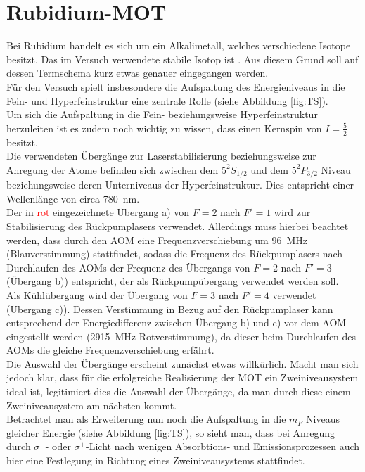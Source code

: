 \documentclass[
class=book,
accentcolor=1b,
custommargins=geometry,
fontsize=11pt,
thesis={type=Versuchsanleitung},
ruledheaders=all,
headline=false,
instbox=false,
marginpar=false,
title=small,
ignore-missing-data=true,
twoside=false,
logofile=apqdesign/tuda_logo.pdf,
pdfa=false %
]{apqpub}
\begin{document}
					\section{Rubidium-MOT}					
					Bei Rubidium handelt es sich um ein Alkalimetall, welches verschiedene Isotope besitzt. 
					Das im Versuch verwendete stabile Isotop ist . Aus diesem Grund soll auf dessen Termschema kurz etwas genauer eingegangen werden.\\
					Für den Versuch spielt insbesondere die Aufspaltung des Energieniveaus in die Fein- und Hyperfeinstruktur eine zentrale Rolle (siehe Abbildung \ref{fig:TS}).\\
					Um sich die Aufspaltung in die Fein- beziehungsweise Hyperfeinstruktur herzuleiten ist es zudem noch wichtig zu wissen, dass  einen Kernspin von $I=\frac{5}{2}$ besitzt.\\ 
					Die verwendeten Übergänge zur Laserstabilisierung beziehungsweise zur Anregung der Atome befinden sich zwischen dem $5^2S_{1/2}$ und dem $5^2P_{3/2}$ Niveau beziehungsweise deren Unterniveaus der Hyperfeinstruktur. 
					Dies entspricht einer Wellenlänge von circa \qty{780}{\nano\metre}.\\
					Der in \textcolor{red}{rot} eingezeichnete Übergang a) von $F=2$ nach $F'=1$ wird zur Stabilisierung des Rückpumplasers verwendet. 
					Allerdings muss hierbei beachtet werden, dass durch den AOM eine Frequenzverschiebung um \qty{96}{\mega\hertz} (Blauverstimmung) stattfindet, sodass die Frequenz des Rückpumplasers nach Durchlaufen des AOMs der Frequenz des Übergangs von $F=2$ nach $F'=3$ (Übergang b)) entspricht, der als Rückpumpübergang verwendet werden soll.\\
					Als Kühlübergang wird der Übergang von $F=3$ nach $F'=4$ verwendet (Übergang c)). 
					Dessen Verstimmung in Bezug auf den Rückpumplaser kann entsprechend der Energiedifferenz zwischen Übergang b) und c) vor dem AOM eingestellt werden (\qty{2915}{\mega\Hz} Rotverstimmung), da dieser beim Durchlaufen des AOMs die gleiche Frequenzverschiebung erfährt.\\   
					Die Auswahl der Übergänge erscheint zunächst etwas willkürlich. Macht man sich jedoch klar, dass für die erfolgreiche Realisierung der MOT ein Zweiniveausystem ideal ist, legitimiert dies die Auswahl der Übergänge, da man durch diese einem Zweiniveausystem am nächsten kommt.\\
					Betrachtet man als Erweiterung nun noch die Aufspaltung in die $m_F$ Niveaus gleicher Energie (siehe Abbildung \ref{fig:TS}), so sieht man, dass bei Anregung durch $\sigma^-$- oder $\sigma^+$-Licht nach wenigen Absorbtions- und Emissionsprozessen auch hier eine Festlegung in Richtung eines Zweiniveausystems stattfindet.\\  
\end{document}
